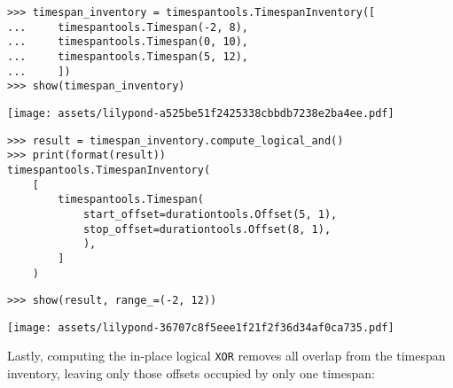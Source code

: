 \begin{abjadbookoutput}
\begin{singlespacing}
\vspace{-0.5\baselineskip}
\begin{verbatim}
>>> timespan_inventory = timespantools.TimespanInventory([
...     timespantools.Timespan(-2, 8),
...     timespantools.Timespan(0, 10),
...     timespantools.Timespan(5, 12),
...     ])
>>> show(timespan_inventory)
\end{verbatim}
\noindent\texttt{[image: assets/lilypond-a525be51f2425338cbbdb7238e2ba4ee.pdf]}
\begin{verbatim}
>>> result = timespan_inventory.compute_logical_and()
>>> print(format(result))
timespantools.TimespanInventory(
    [
        timespantools.Timespan(
            start_offset=durationtools.Offset(5, 1),
            stop_offset=durationtools.Offset(8, 1),
            ),
        ]
    )
\end{verbatim}
\begin{verbatim}
>>> show(result, range_=(-2, 12))
\end{verbatim}
\noindent\texttt{[image: assets/lilypond-36707c8f5eee1f21f2f36d34af0ca735.pdf]}
\end{singlespacing}
\end{abjadbookoutput}

\noindent Lastly, computing the in-place logical \texttt{XOR} removes all
overlap from the timespan inventory, leaving only those offsets occupied by
only one timespan:

\begin{comment}
<abjad>
timespan_inventory = timespantools.TimespanInventory([
    timespantools.Timespan(-2, 2),
    timespantools.Timespan(0, 10),
    timespantools.Timespan(5, 12),
    ])
show(timespan_inventory)
result = timespan_inventory.compute_logical_xor()
print(format(result))
show(result, range_=(-2, 12))
</abjad>
\end{comment}

